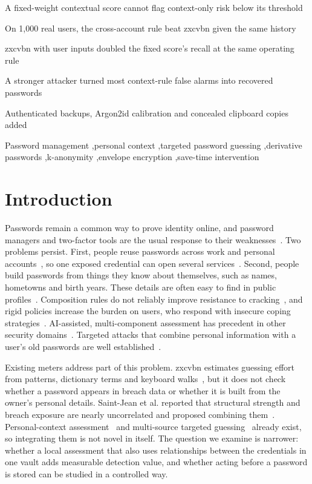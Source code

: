 \documentclass[preprint,12pt]{elsarticle}
\begin{document}
\begin{frontmatter}
\begin{highlights}
\item A fixed-weight contextual score cannot flag context-only risk below its threshold
\item On 1,000 real users, the cross-account rule beat zxcvbn given the same history
\item zxcvbn with user inputs doubled the fixed score's recall at the same operating rule
\item A stronger attacker turned most context-rule false alarms into recovered passwords
\item Authenticated backups, Argon2id calibration and concealed clipboard copies added
\end{highlights}
\begin{keyword}
Password management \sep personal context \sep targeted password guessing \sep derivative passwords \sep k-anonymity \sep envelope encryption \sep save-time intervention
\end{keyword}
\end{frontmatter}
\section{Introduction}
Passwords remain a common way to prove identity online, and password managers and two-factor tools are the usual response to their weaknesses~\cite{jubur}. Two problems persist. First, people reuse passwords across work and personal accounts~\cite{aiswarya}, so one exposed credential can open several services~\cite{farcasin}. Second, people build passwords from things they know about themselves, such as names, hometowns and birth years. These details are often easy to find in public profiles~\cite{atzori2024}. Composition rules do not reliably improve resistance to cracking~\cite{he}, and rigid policies increase the burden on users, who respond with insecure coping strategies~\cite{umejiaku2023}. AI-assisted, multi-component assessment has precedent in other security domains~\cite{nebbione}. Targeted attacks that combine personal information with a user's old passwords are well established~\cite{ou2026,mdiguess}.

Existing meters address part of this problem. zxcvbn estimates guessing effort from patterns, dictionary terms and keyboard walks~\cite{wheeler}, but it does not check whether a password appears in breach data or whether it is built from the owner's personal details. Saint-Jean et al. reported that structural strength and breach exposure are nearly uncorrelated and proposed combining them~\cite{saintjean}. Personal-context assessment~\cite{atzori2024,alatawi} and multi-source targeted guessing~\cite{mdiguess} already exist, so integrating them is not novel in itself. The question we examine is narrower: whether a local assessment that also uses relationships between the credentials in one vault adds measurable detection value, and whether acting before a password is stored can be studied in a controlled way.
\end{document}
